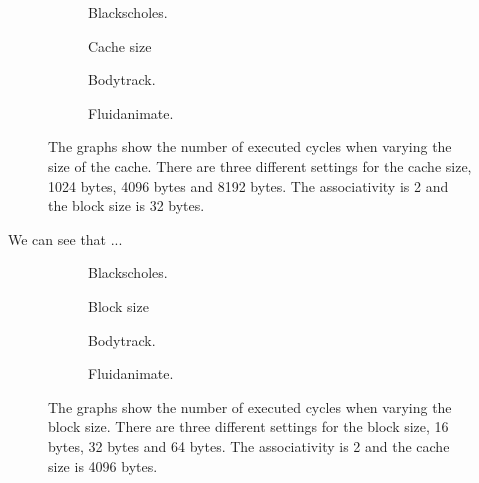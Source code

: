 \begin{figure}[H]
    \centering
    \begin{subfigure}[b]{0.33\textwidth}
        \centering
        \caption{Blackscholes.}\label{fig:cache_size_blackscholes}
    \end{subfigure}%
    \hfill
    \begin{subfigure}[b]{0.33\textwidth}
        \centering
        Cache size\par\medskip
        \caption{Bodytrack.}\label{fig:cache_size_bodytrack}
    \end{subfigure}%
    \hfill
    \begin{subfigure}[b]{0.33\textwidth}
        \centering
        \caption{Fluidanimate.}\label{fig:cache_size_fluidanimate}
    \end{subfigure}
    \hfill
    \caption{The graphs show the number of executed cycles when varying the size of the cache. There are three different settings for the cache size, 1024 bytes, 4096 bytes and 8192 bytes. The associativity is 2 and the block size is 32 bytes.}\label{fig:cache_size}
\end{figure}

We can see that ...


\begin{figure}[H]
    \centering
    \begin{subfigure}[b]{0.33\textwidth}
        \centering
        \caption{Blackscholes.}\label{fig:block_size_blackscholes}
    \end{subfigure}%
    \hfill
    \begin{subfigure}[b]{0.33\textwidth}
        \centering
        Block size\par\medskip
        \caption{Bodytrack.}\label{fig:block_size_bodytrack}
    \end{subfigure}%
    \hfill
    \begin{subfigure}[b]{0.33\textwidth}
        \centering
        \caption{Fluidanimate.}\label{fig:block_size_fluidanimate}
    \end{subfigure}
    \hfill
    \caption{The graphs show the number of executed cycles when varying the block size. There are three different settings for the block size, 16 bytes, 32 bytes and 64 bytes. The associativity is 2 and the cache size is 4096 bytes.}\label{fig:block_size}
\end{figure}

